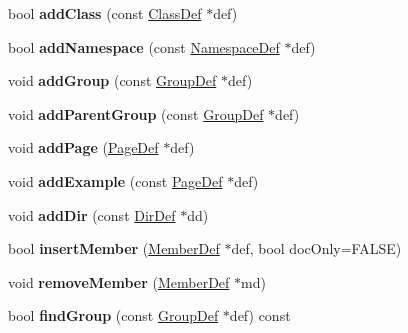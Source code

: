 \begin{DoxyCompactItemize}
bool {\bfseries add\+Class} (const \mbox{\hyperlink{class_class_def}{Class\+Def}} $\ast$def)
\item 
\mbox{\label{class_group_def_a4f4ce1086bd99c08ee4fd20537729bdb}} 
bool {\bfseries add\+Namespace} (const \mbox{\hyperlink{class_namespace_def}{Namespace\+Def}} $\ast$def)
\item 
\mbox{\label{class_group_def_a75f4bf0d8f41de50874ed9a633b1cf0f}} 
void {\bfseries add\+Group} (const \mbox{\hyperlink{class_group_def}{Group\+Def}} $\ast$def)
\item 
\mbox{\label{class_group_def_a6ca14ecf9ec2395e9738b5eb45d01c1a}} 
void {\bfseries add\+Parent\+Group} (const \mbox{\hyperlink{class_group_def}{Group\+Def}} $\ast$def)
\item 
\mbox{\label{class_group_def_aafcf9df1cd66bed1e66cbb05f4f3e694}} 
void {\bfseries add\+Page} (\mbox{\hyperlink{class_page_def}{Page\+Def}} $\ast$def)
\item 
\mbox{\label{class_group_def_aa8a5e75c17e619f7944b67e1f8cb4bab}} 
void {\bfseries add\+Example} (const \mbox{\hyperlink{class_page_def}{Page\+Def}} $\ast$def)
\item 
\mbox{\label{class_group_def_ad0b6731433cd2c276b7edca31f159aa9}} 
void {\bfseries add\+Dir} (const \mbox{\hyperlink{class_dir_def}{Dir\+Def}} $\ast$dd)
\item 
\mbox{\label{class_group_def_a88b12bc96a9c8c58ddfd8ee378d1af15}} 
bool {\bfseries insert\+Member} (\mbox{\hyperlink{class_member_def}{Member\+Def}} $\ast$def, bool doc\+Only=F\+A\+L\+SE)
\item 
\mbox{\label{class_group_def_a05b7c4875a3ad7ee5789ac6cc5da4be9}} 
void {\bfseries remove\+Member} (\mbox{\hyperlink{class_member_def}{Member\+Def}} $\ast$md)
\item 
\mbox{\label{class_group_def_a099dbc6f67c4395deb7edd89823b8bfd}} 
bool {\bfseries find\+Group} (const \mbox{\hyperlink{class_group_def}{Group\+Def}} $\ast$def) const
\item 
\mbox{\label{class_group_def_aab9bf5ba484cedffb49ee38b2f69eb79}} 

\end{DoxyCompactItemize}
